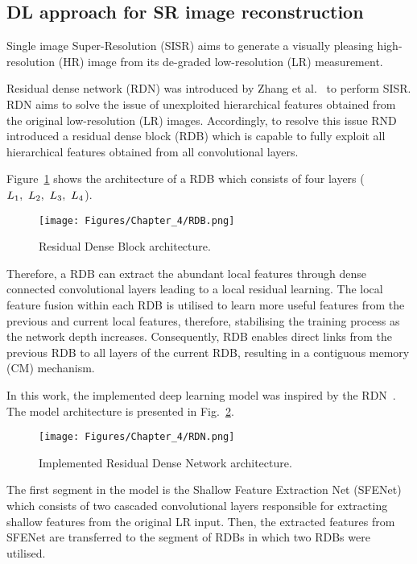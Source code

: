 \subsection{DL approach for SR image reconstruction}
\label{sec63}
Single image Super-Resolution (SISR) aims to generate a visually pleasing high-resolu\-tion (HR) image from its de-graded low-resolution (LR) measurement.

Residual dense network (RDN) was introduced by Zhang et al.~\cite{Zhang2018} to perform SISR.
RDN aims to solve the issue of unexploited hierarchical features obtained from the original low-resolution (LR) images.
Accordingly, to resolve this issue RND introduced a residual dense block (RDB) which is capable to fully exploit all hierarchical features obtained from all convolutional layers.

Figure~\ref{fig:RDB} shows the architecture of a RDB which consists of four  layers (\(L_1,\ L_2,\ L_3,\- \ L_4\)).
\begin{figure} [h!]
	\begin{center}
		\texttt{[image: Figures/Chapter\_4/RDB.png]}
	\end{center}
	\caption{Residual Dense Block architecture.} 
	\label{fig:RDB}
\end{figure}
Therefore, a RDB can extract the abundant local features through dense connected convolutional layers leading to a local residual learning.
The local feature fusion within each RDB is utilised to learn more useful features from the previous and current local features, therefore, stabilising the training process as the network depth increases.
Consequently, RDB enables direct links from the previous RDB to all layers of the current RDB, resulting in a contiguous memory (CM) mechanism.

In this work, the implemented deep learning model was inspired by the RDN~\cite{Zhang2018}. 
The model architecture is presented in Fig.~\ref{fig:RDN}.
\begin{figure} [h!]
	\begin{center}
		\texttt{[image: Figures/Chapter\_4/RDN.png]}
	\end{center}
	\caption{Implemented Residual Dense Network architecture.} 
	\label{fig:RDN}
\end{figure}
The first segment in the model is the Shallow Feature Extraction Net (SFENet) which consists of two cascaded convolutional layers responsible for extracting shallow features from the original LR input.
Then, the extracted features from SFENet are transferred to the segment of RDBs in which two RDBs were utilised.


